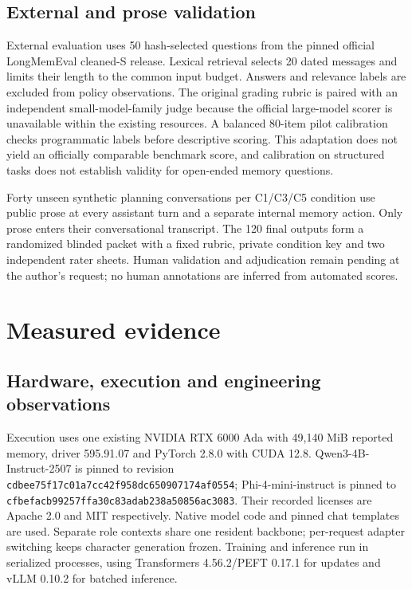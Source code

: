 \documentclass{svproc}
\begin{document}
\subsection{External and prose validation}
External evaluation uses 50 hash-selected questions from the pinned official
LongMemEval cleaned-S release. Lexical retrieval selects 20 dated messages and
limits their length to the common input budget. Answers and relevance labels
are excluded from policy observations. The original grading rubric is paired
with an independent small-model-family judge because the official large-model
scorer is unavailable within the existing resources. A balanced 80-item pilot
calibration checks programmatic labels before descriptive scoring. This adaptation
does not yield an officially comparable benchmark score, and calibration on
structured tasks does not establish validity for open-ended memory questions.

Forty unseen synthetic planning conversations per C1/C3/C5 condition use public
prose at every assistant turn and a separate internal memory action. Only prose
enters their conversational transcript. The 120 final outputs form a randomized
blinded packet with a fixed rubric, private condition key and two independent
rater sheets. Human validation and adjudication remain pending at the author's
request; no human annotations are inferred from automated scores.

\section{Measured evidence}
\subsection{Hardware, execution and engineering observations}
Execution uses one existing NVIDIA RTX 6000 Ada with 49,140 MiB reported memory,
driver 595.91.07 and PyTorch 2.8.0 with CUDA 12.8. Qwen3-4B-Instruct-2507 is pinned
to revision \texttt{cdbee75f17c01a7cc42f958dc650907174af0554};
Phi-4-mini-instruct is pinned to
\texttt{cfbefacb99257ffa30c83adab238a50856ac3083}. Their recorded licenses are
Apache 2.0 and MIT respectively. Native model code and pinned chat templates
are used. Separate role contexts share one resident backbone; per-request
adapter switching keeps character generation frozen. Training and inference
run in serialized processes, using Transformers 4.56.2/PEFT 0.17.1 for updates
and vLLM 0.10.2 for batched inference.
\end{document}
